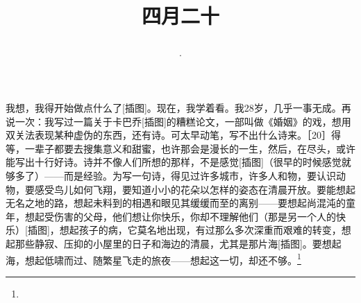 \title{\date[d=27,m=5,y=2024][year:cn-y,年,month:cn,day:cn,日,·,weekday]·四月二十 }
我想，我得开始做点什么了[插图]。现在，我学着看。我28岁，几乎一事无成。再说一次：我写过一篇关于卡巴乔[插图]的糟糕论文，一部叫做《婚姻》的戏，想用双关法表现某种虚伪的东西，还有诗。可太早动笔，写不出什么诗来。［20］得等，一辈子都要去搜集意义和甜蜜，也许那会是漫长的一生，然后，在尽头，或许能写出十行好诗。诗并不像人们所想的那样，不是感觉[插图]（很早的时候感觉就够多了）——而是经验。为写一句诗，得见过许多城市，许多人和物，要认识动物，要感受鸟儿如何飞翔，要知道小小的花朵以怎样的姿态在清晨开放。要能想起无名之地的路，想起未料到的相遇和眼见其缓缓而至的离别——要想起尚混沌的童年，想起受伤害的父母，他们想让你快乐，你却不理解他们（那是另一个人的快乐）[插图]，想起孩子的病，它莫名地出现，有过那么多次深重而艰难的转变，想起那些静寂、压抑的小屋里的日子和海边的清晨，尤其是那片海[插图]。要想起海，想起低啸而过、随繁星飞走的旅夜——想起这一切，却还不够。\footnote{ }

